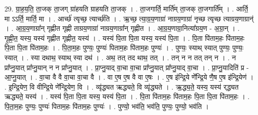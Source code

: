 \documentclass[17pt]{extarticle}
\begin{document}
29. ग्रा॒ह॒य॒ति॒ ता॒जक् ता॒जग् ग्रा॑हयति ग्राहयति ता॒जक् । . ता॒जगार्ति॒ मार्ति॑म् ता॒जक् ता॒जगार्ति᳚म् । . आर्ति॒ मा ऽऽर्ति॒ मार्ति॒ मा । . आर्च्छ॑ त्यृच्छ॒ त्यार्च्छ॑ति । . ऋ॒च्छ॒ त्या॒ग्र॒य॒णाग्रा॑ नाग्रय॒णाग्रा॑ नृच्छ त्यृच्छ त्याग्रय॒णाग्रान्॑ । . आ॒ग्र॒य॒णाग्रा᳚न् गृह्णीत गृह्णी ताग्रय॒णाग्रा॑ नाग्रय॒णाग्रा᳚न् गृह्णीत । . आ॒ग्र॒य॒णाग्रा॒नित्या᳚ग्रय॒ण - अ॒ग्रा॒न् । . गृ॒ह्णी॒त॒ यस्य॒ यस्य॑ गृह्णीत गृह्णीत॒ यस्य॑ । . यस्य॑ पि॒ता पि॒ता यस्य॒ यस्य॑ पि॒ता । . पि॒ता पि॑ताम॒हः पि॑ताम॒हः पि॒ता पि॒ता पि॑ताम॒हः । . पि॒ता॒म॒हः पुण्यः॒ पुण्यः॑ पिताम॒हः पि॑ताम॒हः पुण्यः॑ । . पुण्यः॒ स्याथ् स्यात् पुण्यः॒ पुण्यः॒ स्यात् । . स्या दथाथ॒ स्याथ् स्या दथ॑ । . अथ॒ तत् तद थाथ॒ तत् । . तन् न न तत् तन् न । . न प्रा᳚प्नु॒यात् प्रा᳚प्नु॒यान् न न प्रा᳚प्नु॒यात् । . प्रा॒प्नु॒याद् वा॒चा वा॒चा प्रा᳚प्नु॒यात् प्रा᳚प्नु॒याद् वा॒चा । . प्रा॒प्नु॒यादिति॑ प्र - आ॒प्नु॒यात् । . वा॒चा वै वै वा॒चा वा॒चा वै । . वा ए॒ष ए॒ष वै वा ए॒षः । . ए॒ष इ॑न्द्रि॒ये णे᳚न्द्रि॒ये णै॒ष ए॒ष इ॑न्द्रि॒येण॑ । . इ॒न्द्रि॒येण॒ वि वीन्द्रि॒ये णे᳚न्द्रि॒येण॒ वि । . व्यृ॑द्ध्यत ऋद्ध्यते॒ वि व्यृ॑द्ध्यते । . ऋ॒द्ध्य॒ते॒ यस्य॒ यस्य॑ र्‌द्ध्यत ऋद्ध्यते॒ यस्य॑ । . यस्य॑ पि॒ता पि॒ता यस्य॒ यस्य॑ पि॒ता । . पि॒ता पि॑ताम॒हः पि॑ताम॒हः पि॒ता पि॒ता पि॑ताम॒हः । . पि॒ता॒म॒हः पुण्यः॒ पुण्यः॑ पिताम॒हः पि॑ताम॒हः पुण्यः॑ । . पुण्यो॒ भव॑ति॒ भव॑ति॒ पुण्यः॒ पुण्यो॒ भव॑ति । \newline
\end{document}
